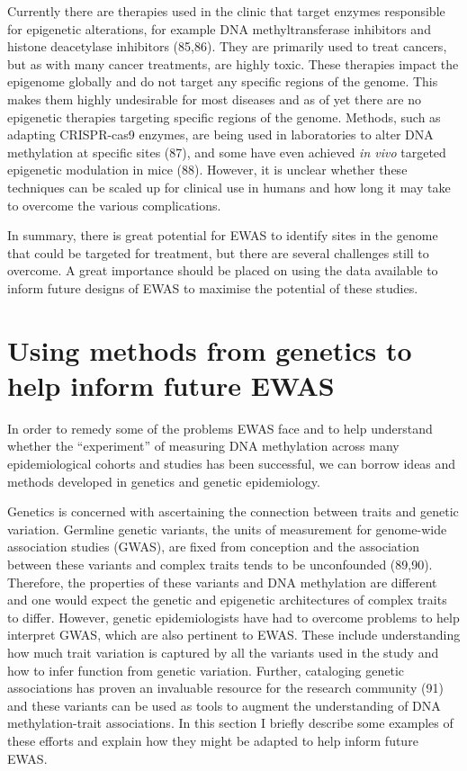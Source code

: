 \documentclass[11pt,oneside]{bristolthesis}
\begin{document}
Currently there are therapies used in the clinic that target enzymes responsible for epigenetic alterations, for example DNA methyltransferase inhibitors and histone deacetylase inhibitors (85,86). They are primarily used to treat cancers, but as with many cancer treatments, are highly toxic. These therapies impact the epigenome globally and do not target any specific regions of the genome. This makes them highly undesirable for most diseases and as of yet there are no epigenetic therapies targeting specific regions of the genome. Methods, such as adapting CRISPR-cas9 enzymes, are being used in laboratories to alter DNA methylation at specific sites (87), and some have even achieved \emph{in vivo} targeted epigenetic modulation in mice (88). However, it is unclear whether these techniques can be scaled up for clinical use in humans and how long it may take to overcome the various complications.

In summary, there is great potential for EWAS to identify sites in the genome that could be targeted for treatment, but there are several challenges still to overcome. A great importance should be placed on using the data available to inform future designs of EWAS to maximise the potential of these studies.

\hypertarget{genetics-in-ewas}{%
\section{Using methods from genetics to help inform future EWAS}\label{genetics-in-ewas}}

In order to remedy some of the problems EWAS face and to help understand whether the ``experiment'' of measuring DNA methylation across many epidemiological cohorts and studies has been successful, we can borrow ideas and methods developed in genetics and genetic epidemiology.

Genetics is concerned with ascertaining the connection between traits and genetic variation. Germline genetic variants, the units of measurement for genome-wide association studies (GWAS), are fixed from conception and the association between these variants and complex traits tends to be unconfounded (89,90). Therefore, the properties of these variants and DNA methylation are different and one would expect the genetic and epigenetic architectures of complex traits to differ. However, genetic epidemiologists have had to overcome problems to help interpret GWAS, which are also pertinent to EWAS. These include understanding how much trait variation is captured by all the variants used in the study and how to infer function from genetic variation. Further, cataloging genetic associations has proven an invaluable resource for the research community (91) and these variants can be used as tools to augment the understanding of DNA methylation-trait associations. In this section I briefly describe some examples of these efforts and explain how they might be adapted to help inform future EWAS.
\end{document}
